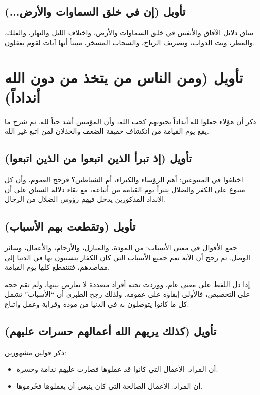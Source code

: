 \subsection{تأويل (إن في خلق السماوات والأرض...)}
ساق  دلائل الآفاق والأنفس في خلق السماوات والأرض، واختلاف الليل والنهار، والفلك، والمطر، وبث الدواب، وتصريف الرياح، والسحاب المسخر، مبيناً أنها آيات لقوم يعقلون.

\separator

\section{تأويل (ومن الناس من يتخذ من دون الله أنداداً)}
ذكر  أن هؤلاء جعلوا لله أنداداً يحبونهم كحب الله، وأن المؤمنين أشد حباً لله. ثم شرح ما يقع يوم القيامة من انكشاف حقيقة الضعف والخذلان لمن اتبع غير الله.

\subsection{تأويل (إذ تبرأ الذين اتبعوا من الذين اتبعوا)}
اختلفوا في المتبوعين: أهم الرؤساء والكبراء، أم الشياطين؟ فرجح  العموم، وأن كل متبوع على الكفر والضلال يتبرأ يوم القيامة من أتباعه، مع بقاء دلالة السياق على أن الأنداد المذكورين يدخل فيهم رؤوس الضلال من الرجال.

\subsection{تأويل (وتقطعت بهم الأسباب)}
جمع  الأقوال في معنى الأسباب: من المودة، والمنازل، والأرحام، والأعمال، وسائر الوصل. ثم رجح أن الآية تعم جميع الأسباب التي كان الكفار يتسببون بها في الدنيا إلى مقاصدهم، فتتنقطع كلها يوم القيامة.

\begin{fawaid}
إذا دل اللفظ على معنى عام، ووردت تحته أفراد متعددة لا تعارض بينها، ولم تقم حجة على التخصيص، فالأولى إبقاؤه على عمومه. ولذلك رجح الطبري أن ``الأسباب'' تشمل كل ما كانوا يتوصلون به في الدنيا من مودة وقرابة وعمل واتباع.
\end{fawaid}

\subsection{تأويل (كذلك يريهم الله أعمالهم حسرات عليهم)}
ذكر  قولين مشهورين:
\begin{itemize}
    \item أن المراد: الأعمال التي كانوا قد عملوها فصارت عليهم ندامة وحسرة.
    \item أن المراد: الأعمال الصالحة التي كان ينبغي أن يعملوها فحُرموها.
\end{itemize}

